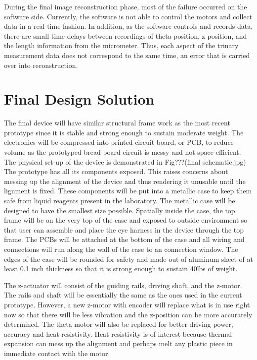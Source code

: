 \documentclass{article}
\begin{document}
	During the final image reconstruction phase, most of the failure occurred on the software side. Currently, the software is not able to control the motors and collect data in a real-time fashion. In addition, as the software controls and records data, there are small time-delays between recordings of theta position, z position, and the length information from the micrometer. Thus, each aspect of the trinary measurement data does not correspond to the same time, an error that is carried over into reconstruction. 







\section{Final Design Solution}
\label{sec:final-design-solut}

The final device will have similar structural frame work as the most recent prototype since it is stable and 
strong enough to sustain moderate weight. The electronics will be compressed into printed circuit board, or 
PCB, to reduce volume as the prototyped bread board circuit is messy and not space-efficient. The 
physical set-up of the device is demonstrated in Fig???(final schematic.jpg) The prototype has all its 
components exposed. This raises concerns about messing up the alignment of the device and thus 
rendering it unusable until the lignment is fixed. These components will be put into a metallic case to keep 
them safe from liquid reagents present in the laboratory. The metallic case will be designed to have the 
smallest size possible. Spatially inside the case, the top frame will be on the very top of the case and 
exposed to outside environment so that user can assemble and place the eye harness in the device 
through the top frame. The PCBs will be attached at the bottom of the case and all wiring and connections 
will run along the wall of the case to an connection window. The edges of the case will be rounded for 
safety and made out of aluminum sheet of at least 0.1 inch thickness so that it is strong enough to sustain 
40lbs of weight. 

The z-actuator will consist of the guiding rails, driving shaft, and the z-motor. The rails and shaft will be essentially the same as the ones used in the current prototype. However, a new z-motor with encoder will replace what is in use right now so that there will be less vibration and the z-position can be more accurately determined. The theta-motor will also be replaced for better driving power, accuracy and heat resistivity. Heat resistivity is of interest because thermal expansion can mess up the alignment and perhaps melt any plastic piece in immediate contact with the motor.
\end{document}
